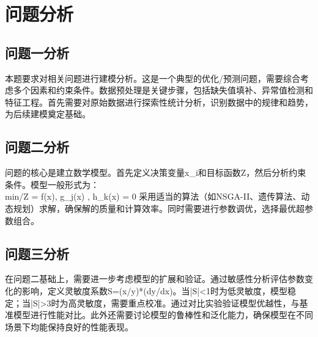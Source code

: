 \newpage
\section{问题分析}

\subsection{问题一分析}
本题要求对相关问题进行建模分析。这是一个典型的优化/预测问题，需要综合考虑多个因素和约束条件。数据预处理是关键步骤，包括缺失值填补、异常值检测和特征工程。首先需要对原始数据进行探索性统计分析，识别数据中的规律和趋势，为后续建模奠定基础。

\subsection{问题二分析}
问题的核心是建立数学模型。首先定义决策变量x_i和目标函数Z，然后分析约束条件。模型一般形式为：
\\min/\max \quad Z = f(x), \quad {} \quad g_j(x) , \; h_k(x) = 0
采用适当的算法（如NSGA-II、遗传算法、动态规划）求解，确保解的质量和计算效率。同时需要进行参数调优，选择最优超参数组合。

\subsection{问题三分析}
在问题二基础上，需要进一步考虑模型的扩展和验证。通过敏感性分析评估参数变化的影响，定义灵敏度系数S=(x/y)*(dy/dx)。当|S|<1时为低灵敏度，模型稳定；当|S|>3时为高灵敏度，需要重点校准。通过对比实验验证模型优越性，与基准模型进行性能对比。此外还需要讨论模型的鲁棒性和泛化能力，确保模型在不同场景下均能保持良好的性能表现。